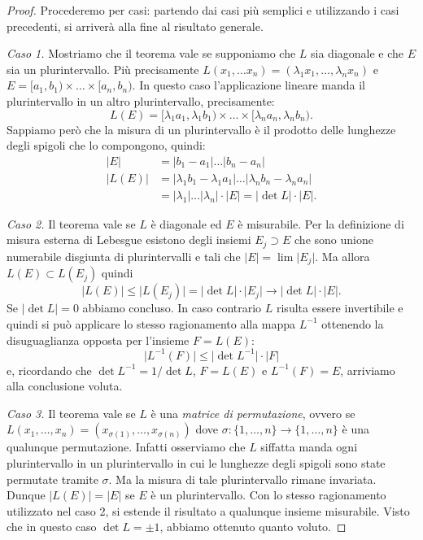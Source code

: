 \documentclass[italian,a4paper]{scrartcl}
\begin{document}
\begin{proof}
Procederemo per casi: partendo dai casi più semplici e
utilizzando i casi precedenti, si arriverà alla fine al risultato generale.

\emph{Caso 1.} Mostriamo che il teorema vale se supponiamo che $L$ sia diagonale e
che $E$ sia un plurintervallo. Più precisamente $L(x_1,\dots x_n) =
(\lambda_1 x_1, \dots, \lambda_n x_n)$ e $E = [a_1,b_1) \times \dots
\times [a_n, b_n)$. 
In questo caso l'applicazione lineare manda il plurintervallo in un
altro plurintervallo, precisamente: 
\[
  L(E) = [\lambda_1 a_1, \lambda_1 b_1)\times \dots \times [\lambda_n a_n, \lambda_n b_n).
\]
Sappiamo però che la misura di un plurintervallo è il prodotto delle
lunghezze degli spigoli che lo compongono, quindi: 
\begin{align*}
|E| & = |b_1-a_1|\dots |b_n-a_n| \\
|L(E)| &= |\lambda_1 b_1 - \lambda_1 a_1|\dots |\lambda_n b_n - \lambda_n a_n| \\ 
    &= \lvert \lambda_1\rvert \dots \lvert \lambda_n\rvert \cdot
\lvert E\rvert 
     = \lvert \det L \rvert \cdot \lvert E \rvert. 
\end{align*}

\emph{Caso 2.} Il teorema vale se $L$ è diagonale ed $E$ è
misurabile. Per la definizione di misura esterna di Lebesgue esistono
degli insiemi $E_j\supset E$ che sono unione numerabile disgiunta di
plurintervalli e tali che $\lvert E \rvert = \lim \lvert
E_j\rvert$.
Ma allora $L(E)\subset L(E_j)$ quindi
\[
\lvert L(E)\rvert 
\le \lvert L(E_j)\rvert 
= \lvert \det L \rvert \cdot \lvert E_j \rvert 
\to \lvert \det L \rvert \cdot \lvert E \rvert.
\]
Se $\lvert \det L\rvert = 0$ abbiamo concluso. 
In caso contrario $L$ risulta essere invertibile e quindi si può
applicare lo stesso ragionamento alla mappa $L^{-1}$ ottenendo la
disuguaglianza opposta per l'insieme $F=L(E)$:
\[
 \lvert L^{-1}(F) \rvert \le \lvert \det L^{-1}\rvert \cdot \lvert F \rvert
\]
e, ricordando che $\det L^{-1} = 1/\det L$, $F=L(E)$ e $L^{-1}(F)=E$,
arriviamo alla conclusione voluta.

\emph{Caso 3.} Il teorema vale se $L$ è una \emph{matrice di
  permutazione}, ovvero se $L(x_1, \dots, x_n) = (x_{\sigma(1)},
\dots, x_{\sigma(n)})$ dove $\sigma\colon \{1,\dots,n\}\to\{1,\dots,
n\}$ è una qualunque permutazione.
Infatti osserviamo che $L$ siffatta manda ogni plurintervallo in un
plurintervallo in cui le lunghezze degli spigoli sono state
permutate tramite $\sigma$. Ma la misura di tale plurintervallo
rimane invariata.
Dunque $|L(E)|=|E|$ se $E$ è un plurintervallo. 
Con lo stesso ragionamento utilizzato nel caso 2, si estende il
risultato a qualunque insieme misurabile. Visto che in questo caso
$\det L = \pm 1$, abbiamo ottenuto quanto voluto.


\end{proof}
\end{document}
